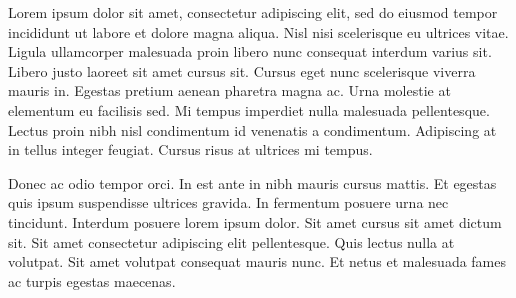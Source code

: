 Lorem ipsum dolor sit amet, consectetur adipiscing elit, sed do eiusmod tempor incididunt ut labore et dolore magna aliqua. Nisl nisi scelerisque eu ultrices vitae. Ligula ullamcorper malesuada proin libero nunc consequat interdum varius sit. Libero justo laoreet sit amet cursus sit. Cursus eget nunc scelerisque viverra mauris in. Egestas pretium aenean pharetra magna ac. Urna molestie at elementum eu facilisis sed. Mi tempus imperdiet nulla malesuada pellentesque. Lectus proin nibh nisl condimentum id venenatis a condimentum. Adipiscing at in tellus integer feugiat. Cursus risus at ultrices mi tempus.

Donec ac odio tempor orci. In est ante in nibh mauris cursus mattis. Et egestas quis ipsum suspendisse ultrices gravida. In fermentum posuere urna nec tincidunt. Interdum posuere lorem ipsum dolor. Sit amet cursus sit amet dictum sit. Sit amet consectetur adipiscing elit pellentesque. Quis lectus nulla at volutpat. Sit amet volutpat consequat mauris nunc. Et netus et malesuada fames ac turpis egestas maecenas.
